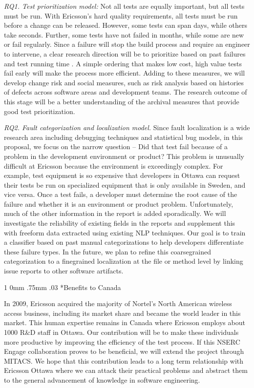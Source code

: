 \documentclass[12pt, letterpaper]{article}
\makeatletter
\renewcommand{\section}{\@startsection
{section}%
{1}%
{0mm}%
{.75mm}
{.03\baselineskip}%
{\normalfont\large\bf} %
}
\makeatother
\begin{document}
{\it RQ1. Test prioritization model:} Not all tests are equally important, but all
tests must be run. With Ericsson's hard quality requirements, all tests must be
run before a change can be released. However, some tests can span days, while
others take seconds. Further, some tests have not failed in months, while some
are new or fail regularly. Since a failure will stop the build process and
require an engineer to intervene, a clear research direction will be to
prioritize based on past failures and test running time \cite{Kim2002ICSE,Yu2008ICSE}. A
simple ordering that makes low cost, high value tests fail early will make the
process more efficient.  Adding to these measures, we will develop change risk
and social measures, such as risk analysis based on histories of defects across
software areas and development teams. The research outcome of this stage will
be a better understanding of the archival measures that provide good test
prioritization.

{\it RQ2. Fault categorization and localization model.} Since fault localization is a
wide research area including debugging techniques and statistical bug models,
in this proposal, we focus on the narrow question -- Did that test fail because
of a problem in the development environment or product? This problem is
unusually difficult at Ericsson because the environment is exceedingly complex.
For example, test equipment is so expensive that developers in Ottawa can
request their tests be run on specialized equipment that is only available in
Sweden, and vice versa.
%
Once a test fails, a developer must determine the root cause of the failure and
whether it is an environment or product problem. Unfortunately, much of the
other information in the report is added sporadically. We will investigate the
reliability of existing fields in the reports and supplement this with freeform
data extracted using existing NLP techniques. Our goal is to train a classifier
based on past manual categorizations to help developers differentiate these
failure types. In the future, we plan to refine this coarsegrained
categorization to a finegrained localization at the file or method level by
linking issue reports to other software artifacts.

\section*{Benefits to Canada}

In 2009, Ericsson acquired the majority of Nortel's North American wireless
access business, including its market share and became the world leader in this
market. This human expertise remains in Canada where Ericsson employs about
1000 R\&D staff in Ottawa. Our contribution will be to make these individuals
more productive by improving the efficiency of the test process. If this NSERC
Engage collaboration proves to be beneficial, we will extend the project
through MITACS. We hope that this contribution leads to a long term
relationship with Ericsson Ottawa where we can attack their practical problems
and abstract them to the general advancement of knowledge in software
engineering.



\pagebreak


\end{document}
